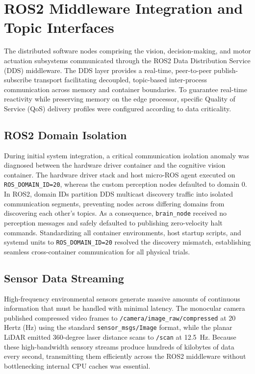 \section{ROS2 Middleware Integration and Topic Interfaces}
\label{sec:ros2_middleware}
The distributed software nodes comprising the vision, decision-making, and motor actuation subsystems communicated through the ROS2 Data Distribution Service (DDS) middleware. The DDS layer provides a real-time, peer-to-peer publish-subscribe transport facilitating decoupled, topic-based inter-process communication across memory and container boundaries. To guarantee real-time reactivity while preserving memory on the edge processor, specific Quality of Service (QoS) delivery profiles were configured according to data criticality.

\subsection{ROS2 Domain Isolation}
During initial system integration, a critical communication isolation anomaly was diagnosed between the hardware driver container and the cognitive vision container. The hardware driver stack and host micro-ROS agent executed on \texttt{ROS\_DOMAIN\_ID=20}, whereas the custom perception nodes defaulted to domain 0. In ROS2, domain IDs partition DDS multicast discovery traffic into isolated communication segments, preventing nodes across differing domains from discovering each other's topics. As a consequence, \texttt{brain\_node} received no perception messages and safely defaulted to publishing zero-velocity halt commands. Standardizing all container environments, host startup scripts, and systemd units to \texttt{ROS\_DOMAIN\_ID=20} resolved the discovery mismatch, establishing seamless cross-container communication for all physical trials.

\subsection{Sensor Data Streaming}
High-frequency environmental sensors generate massive amounts of continuous information that must be handled with minimal latency. The monocular camera published compressed video frames to \texttt{/camera/image\_raw/compressed} at 20 Hertz (Hz) using the standard \texttt{sensor\_msgs/Image} format, while the planar LiDAR emitted 360-degree laser distance scans to \texttt{/scan} at 12.5~Hz. Because these high-bandwidth sensory streams produce hundreds of kilobytes of data every second, transmitting them efficiently across the ROS2 middleware without bottlenecking internal CPU caches was essential.

